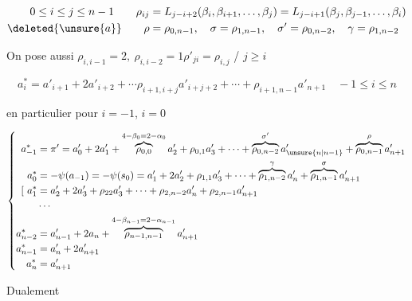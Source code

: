 \[
\begin{aligned}
0\le i\le j\le n-1\qquad \rho_{ij}&=L_{j-i+2}(\beta_i,\beta_{i+1},\ldots,\beta_j)=L_{j-i+1}(\beta_j,\beta_{j-1},\ldots,\beta_i)\\
\deleted{\unsure{a}}\qquad \rho&=\rho_{0,n-1},\quad \sigma=\rho_{1,n-1},\quad \sigma'=\rho_{0,n-2},\quad \gamma=\rho_{1,n-2}
\end{aligned}
\]


On pose aussi $\rho_{i,i-1}=2,\ \rho_{i,i-2}=1$\qquad $\rho'_{ji}=\rho_{i,j}$ / $j\ge i$

\[
\boxed{a_i^*=a'_{i+1}+2a'_{i+2}+\cdots\rho_{i+1,i+j}a'_{i+j+2}+\cdots+\rho_{i+1,n-1}a'_{n+1}}\quad -1\le i\le n
\]

\qquad en particulier pour $i=-1$, $i=0$

\[
\left\{\begin{aligned}
a_{-1}^*&=\pi'=a'_0+2a'_1+\overbrace{\rho_{0,0}}^{4-\beta_0=2-\alpha_0}a'_2+\rho_{0,1}a'_3+\cdots+\overbrace{\rho_{0,n-2}}^{\sigma'}a'_{\unsure{n|n-1}}+\overbrace{\rho_{0,n-1}}^{\rho}a'_{n+1}\\
a_0^*&=-\psi(a_{-1})=-\psi(s_0)=a'_1+2a'_2+\rho_{1,1}a'_3+\cdots+\overbrace{\rho_{1,n-2}}^\gamma a'_n+\overbrace{\rho_{1,n-1}}^\sigma a'_{n+1}\\
[\ a_1^*&=a'_2+2a'_3+\rho_{22}a'_3+\cdots+\rho_{2,n-2}a'_n+\rho_{2,n-1}a'_{n+1}\\
&\cdots\\
a_{n-2}^*&=a'_{n-1}+2a_n+\overbrace{\rho_{n-1,n-1}}^{4-\beta_{n-1}=2-\alpha_{n-1}}a'_{n+1}\\
a_{n-1}^*&=a'_n+2a'_{n+1}\\
a_n^*&=a'_{n+1}
\end{aligned}\right.
\]


Dualement

